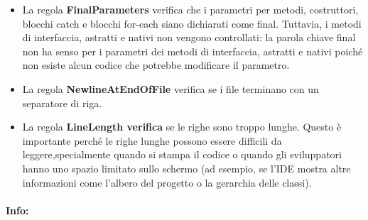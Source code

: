 \begin{itemize}
		\item La regola \textbf{\textbf{FinalParameters}} verifica che i parametri per metodi, costruttori, blocchi catch e blocchi for-each siano dichiarati come final. Tuttavia, i metodi di interfaccia, astratti e nativi non vengono controllati: la parola chiave final non ha senso per i parametri dei metodi di interfaccia, astratti e nativi poiché non esiste alcun codice che potrebbe modificare il parametro.

		\item La regola \textbf{\textbf{NewlineAtEndOfFile}} verifica se i file terminano con un separatore di riga.

		\item La regola \textbf{\textbf{LineLength verifica}} se le righe sono troppo lunghe. Questo è importante perché le righe lunghe possono essere difficili da leggere,specialmente quando si stampa il codice o quando gli sviluppatori hanno uno spazio limitato sullo schermo (ad esempio, se l’IDE mostra altre informazioni come l’albero del progetto o la gerarchia delle classi).

	\end{itemize}

\paragraph{Info:}

